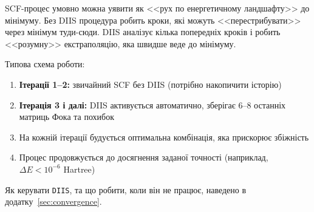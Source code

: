 SCF-процес умовно можна уявити як <<рух по енергетичному ландшафту>> до мінімуму. Без DIIS процедура робить кроки, які можуть <<перестрибувати>> через мінімум туди-сюди. DIIS аналізує кілька попередніх кроків і робить <<розумну>> екстраполяцію, яка швидше веде до мінімуму.

Типова схема роботи:
\begin{enumerate}
	\item \textbf{Ітерації 1--2:} звичайний SCF без DIIS (потрібно накопичити історію)
	\item \textbf{Ітерація 3 і далі:} DIIS активується автоматично, зберігає 6--8 останніх матриць Фока та похибок
	\item На кожній ітерації будується оптимальна комбінація, яка прискорює збіжність
	\item Процес продовжується до досягнення заданої точності (наприклад, $\Delta E < 10^{-6}$ Hartree)
\end{enumerate}

Як керувати \texttt{DIIS}, та що робити, коли він не працює, наведено в додатку~\ref{sec:convergence}.
